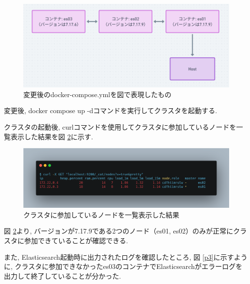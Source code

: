 \begin{figure}[!ht]
  \begin{center}
    \includegraphics[width=160mm]{sotu/figure/2-7.19.9-and-1-7.17.6.png}
    \caption{変更後のdocker-compose.ymlを図で表現したもの}
    \label{d2}
  \end{center}
\end{figure}



変更後, docker compose up -dコマンドを実行してクラスタを起動する.

クラスタの起動後, curlコマンドを使用してクラスタに参加しているノードを一覧表示した結果を図 \ref{p2}に示す.

\begin{figure}[!ht]
  \begin{center}
    \includegraphics[width=160mm]{sotu/figure/curl-different.png}
    \caption{クラスタに参加しているノードを一覧表示した結果}
    \label{p2}
  \end{center}
\end{figure}

図 \ref{p2}より, バージョンが7.17.9である2つのノード（es01, es02）のみが正常にクラスタに参加できていることが確認できる.

また, Elasticsearch起動時に出力されたログを確認したところ, 図 \ref{p3}に示すように, クラスタに参加できなかったes03のコンテナでElasticsearchがエラーログを出力して終了していることが分かった.

